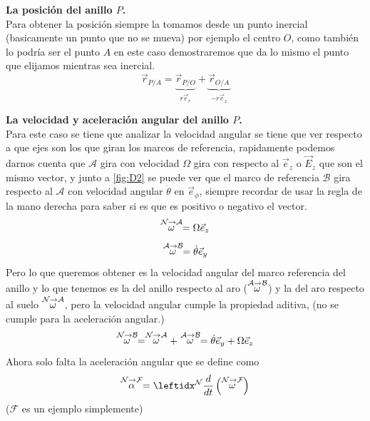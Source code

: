 \begin{tcolorbox}[title=Anillo rotador,breakable]
\begin{center}
\begin{minipage}{0.48\textwidth}
    \end{minipage}
\end{center}

\textbf{La posición del anillo \( P \).}\\
Para obtener la posición siempre la tomamos desde un punto inercial (basicamente un punto que no se mueva) por ejemplo el centro  $O$, como también lo podría ser el punto $A$ en este caso demostraremos que da lo mismo el punto que elijamos mientras sea inercial.
$$\vec{r}_{P/A}=\underbrace{\vec{r}_{P/O}}_{r\vec{e}_r} +\underbrace{\vec{r}_{O/A}}_{-r\vec{e}_z}$$

\textbf{La velocidad y aceleración angular del anillo \( P \).}\\
Para este caso se tiene que analizar la velocidad angular se tiene que ver respecto a que ejes son los que giran los marcos de referencia, rapidamente podemos darnos cuenta que $\mathcal{A}$ gira con velocidad $\Omega$ gira con respecto al $\vec{e}_z$ o $\vec{E}_z$ que son el mismo vector, y junto a \ref{fig:D2} se puede ver que el marco de referencia $\mathcal{B}$ gira respecto al $\mathcal{A}$ con velocidad angular $\dot\theta$ en $\vec{e}_{\phi}$, siempre recordar de usar la regla de la mano derecha para saber si es que es positivo o negativo el vector.
$$\stackrel{\mathcal{N} \to \mathcal{A}}{\omega}=\Omega\vec{e}_z$$
$$\stackrel{\mathcal{A} \to \mathcal{B}}{\omega}=\dot\theta\vec{e}_y$$
Pero lo que queremos obtener es la velocidad angular del marco referencia del anillo y lo que tenemos es la del anillo respecto al aro ($\stackrel{\mathcal{A} \to \mathcal{B}}{\omega}$) y la del aro respecto al suelo $\stackrel{\mathcal{N} \to \mathcal{A}}{\omega}$, pero la velocidad angular cumple la propiedad aditiva, (no se cumple para la aceleración angular.)
$$\stackrel{\mathcal{N} \to \mathcal{B}}{\omega}=\stackrel{\mathcal{N} \to \mathcal{A}}{\omega}+\stackrel{\mathcal{A} \to \mathcal{B}}{\omega}=\dot\theta\vec{e}_y+\Omega\vec{e}_z$$
Ahora solo falta la aceleración angular que se define como 
$$\accang{N}{F} =\der{}{N}\left(\velang{N}{F}\right)$$ ($\mathcal{F}$ es un ejemplo simplemente)\\


\end{tcolorbox}

